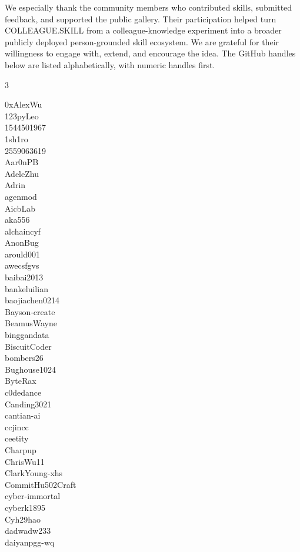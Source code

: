 \documentclass{article}
\newcommand{\system}{\textsc{COLLEAGUE.SKILL}\xspace}
\begin{document}
We especially thank the community members who contributed skills, submitted feedback, and supported the public gallery. Their participation helped turn \system from a colleague-knowledge experiment into a broader publicly deployed person-grounded skill ecosystem. We are grateful for their willingness to engage with, extend, and encourage the idea. The GitHub handles below are listed alphabetically, with numeric handles first.

\begingroup
\scriptsize
\setlength{\columnsep}{1.4em}
\begin{multicols}{3}
\raggedright
0xAlexWu\\
123pyLeo\\
1544501967\\
1sh1ro\\
2559063619\\
Aar0nPB\\
AdeleZhu\\
Adrin\\
agenmod\\
AicbLab\\
aka556\\
alchaincyf\\
AnonBug\\
arould001\\
awecsfgvs\\
baibai2013\\
bankeluilian\\
baojiachen0214\\
Bayson-create\\
BeamusWayne\\
binggandata\\
BiscuitCoder\\
bombers26\\
Bughouse1024\\
ByteRax\\
c0dedance\\
Canding3021\\
cantian-ai\\
ccjincc\\
ceetity\\
Charpup\\
ChrisWu11\\
ClarkYoung-xhs\\
CommitHu502Craft\\
cyber-immortal\\
cyberk1895\\
Cyh29hao\\
dadwadw233\\
daiyanpgg-wq\\

\end{multicols}
\end{document}

